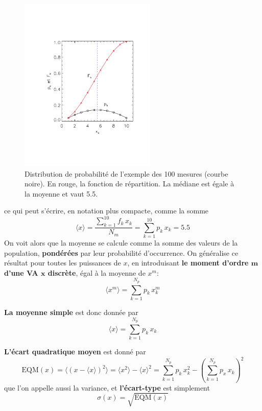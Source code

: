 \begin{figure}
   \centering
   \vspace{-4mm}
   \includegraphics[width=6.5cm]{assets/figures/probabiliteEtfonctiondeRepartition.pdf}
   \caption{Distribution de probabilité de l'exemple des 100 mesures (courbe noire). En rouge, la fonction de répartition. La médiane est égale à la moyenne et vaut 5.5.}
   \label{fig:edfdr}
\end{figure}

ce qui peut s'écrire, en notation plus compacte, comme la somme
\begin{equation}
\langle x\rangle=\frac{\sum_{k=1}^{10}f_k\,x_k}{N_m}=\sum_{k=1}^{10}p_k\,x_k=5.5
\end{equation}
On voit alors que la moyenne se calcule comme la somme des valeurs de la population, \textbf{pondérées} par leur probabilité d'occurrence. On généralise ce résultat pour toutes les puissances de $x$, en introduisant \textbf{le moment d'ordre $\mathbf{m}$ d'une VA $\mathbf{x}$ discrète}, égal à la moyenne de $x^m$:
\begin{equation}
\langle x^m\rangle=\sum_{k=1}^{N_p}p_k\,x_k^m
\end{equation}

\noindent\textbf{La moyenne simple} est donc donnée par
\begin{equation}
\langle x\rangle=\sum_{k=1}^{N_p}p_k\,x_k
\end{equation}

\textbf{L'écart quadratique moyen} est donné par
\begin{equation}
\text{EQM}(x)=\langle (x-\langle x\rangle)^2\rangle=\langle x^2\rangle-\langle x\rangle^2=\sum_{k=1}^{N_p}p_k\,x_k^2-\left(\sum_{k=1}^{N_p}p_x\,x_k\right)^2
\end{equation}
que l'on appelle aussi la variance, et \textbf{l'écart-type} est simplement
\begin{equation}
\sigma(x)=\sqrt{\text{EQM}(x)}
\end{equation}


